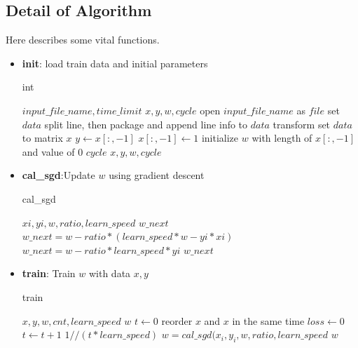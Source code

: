 \documentclass[conference,compsoc]{IEEEtran}
\renewcommand{\algorithmicrequire}{\textbf{Input:}}
\renewcommand{\algorithmicensure}{\textbf{Output:}}
\begin{document}
\subsection{Detail of Algorithm}
Here describes some vital functions.
\begin{itemize}
    \item \textbf{init}: load train data and initial parameters
    \begin{algorithm}[H]
     \caption{int}
     \begin{algorithmic}[1]
     \renewcommand{\algorithmicrequire}{\textbf{Input:}}
     \renewcommand{\algorithmicensure}{\textbf{Output:}}
     \REQUIRE $input\_file\_name, time\_limit$
     \ENSURE $x, y, w, cycle$
     \STATE open $input\_file\_name$ as $file$
     \STATE set $data$
          \STATE split line, then package and append line info to $data$
     \ENDFOR
     \STATE transform set $data$ to matrix $x$
     \STATE $y \leftarrow x[:,-1]$ 
     \STATE $x[:, -1] \leftarrow 1$
     \STATE initialize $w$ with length of $x[:, -1]$ and value of 0
     \STATE $cycle$
     \RETURN $x, y, w, cycle$
     \end{algorithmic}
   \end{algorithm}

   \item \textbf{cal\_sgd}:Update $w$ using gradient descent
     \begin{algorithm}[H]
     \caption{cal\_sgd}
     \begin{algorithmic}[2]
     \renewcommand{\algorithmicrequire}{\textbf{Input:}}
     \renewcommand{\algorithmicensure}{\textbf{Output:}}
     \REQUIRE $xi, yi, w, ratio, learn\_speed$
     \ENSURE $w\_next$ 
	     \STATE $w\_next = w - ratio*(learn\_speed*w - yi*xi)$
     \ELSE
	     \STATE $w\_next = w - ratio*learn\_speed*yi$
     \ENDIF
     \RETURN $w\_next$
     \end{algorithmic}
     \end{algorithm}

  \item \textbf{train}: Train $w$ with data $x, y$
    \begin{algorithm}[H]
     \caption{train}
     \begin{algorithmic}[3]
     \renewcommand{\algorithmicrequire}{\textbf{Input:}}
     \renewcommand{\algorithmicensure}{\textbf{Output:}}
     \REQUIRE $x, y, w, cnt, learn\_speed$
     \ENSURE  $w$
     \STATE $t \leftarrow 0$
	     \STATE reorder $x$ and $x$ in the same time
	     \STATE $loss \leftarrow 0$ 
	     \STATE $t \leftarrow t+1$
	     \STATE $1//(t*learn\_speed)$
	          \STATE $w = cal\_sgd(x_i, y_i, w, ratio, learn\_speed$
	     \ENDFOR
     \ENDWHILE
     \RETURN $w$
     \end{algorithmic}
     \end{algorithm}
 

\end{itemize}
\end{document}
